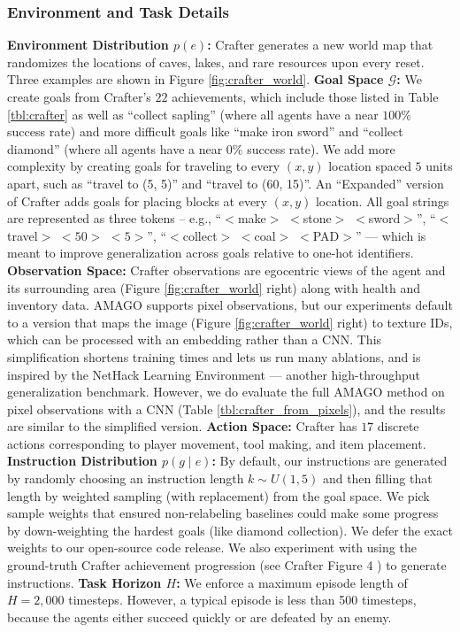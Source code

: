 \documentclass{article}
\begin{document}
\subsubsection{Environment and Task Details}
\textbf{Environment Distribution $p(e)$:} Crafter generates a new world map that randomizes the locations of caves, lakes, and rare resources upon every reset. Three examples are shown in Figure \ref{fig:crafter_world}.
\textbf{Goal Space $\mathcal{G}$:} We create goals from Crafter's $22$ achievements, which include those listed in Table \ref{tbl:crafter} as well as ``collect sapling'' (where all agents have a near $100\%$ success rate) and more difficult goals like ``make iron sword'' and ``collect diamond'' (where all agents have a near $0\%$ success rate). We add more complexity by creating goals for traveling to every $(x, y)$ location spaced $5$ units apart, such as ``travel to (5, 5)'' and ``travel to (60, 15)''. An ``Expanded'' version of Crafter adds goals for placing blocks at every $(x, y)$ location. All goal strings are represented as three tokens -- e.g., ``$<$make$>$ $<$stone$>$ $<$sword$>$'', ``$<$travel$>$ $<50>$ $<5>$'', ``$<$collect$>$ $<$coal$>$ $<$PAD$>$'' --- which is meant to improve generalization across goals relative to one-hot identifiers.
\textbf{Observation Space:} Crafter observations are egocentric views of the agent and its surrounding area (Figure \ref{fig:crafter_world} right) along with health and inventory data. AMAGO supports pixel observations, but our experiments default to a version that maps the image (Figure \ref{fig:crafter_world} right) to texture IDs, which can be processed with an embedding rather than a CNN. This simplification shortens training times and lets us run many ablations, and is inspired by the NetHack Learning Environment \cite{kuttler2020nethack} --- another high-throughput generalization benchmark. However, we do evaluate the full AMAGO method on pixel observations with a CNN (Table \ref{tbl:crafter_from_pixels}), and the results are similar to the simplified version.
\textbf{Action Space:} Crafter has $17$ discrete actions corresponding to player movement, tool making, and item placement.
\textbf{Instruction Distribution $p(g \mid e)$:} By default, our instructions are generated by randomly choosing an instruction length $k \sim U(1, 5)$ and then filling that length by weighted sampling (with replacement) from the goal space. We pick sample weights that ensured non-relabeling baselines could make some progress by down-weighting the hardest goals (like diamond collection). We defer the exact weights to our open-source code release. We also experiment with using the ground-truth Crafter achievement progression (see Crafter Figure 4 \cite{hafner2021benchmarking}) to generate instructions.
\textbf{Task Horizon $H$:} We enforce a maximum episode length of $H = 2,000$ timesteps. However, a typical episode is less than 500 timesteps, because the agents either succeed quickly or are defeated by an enemy.
\end{document}

